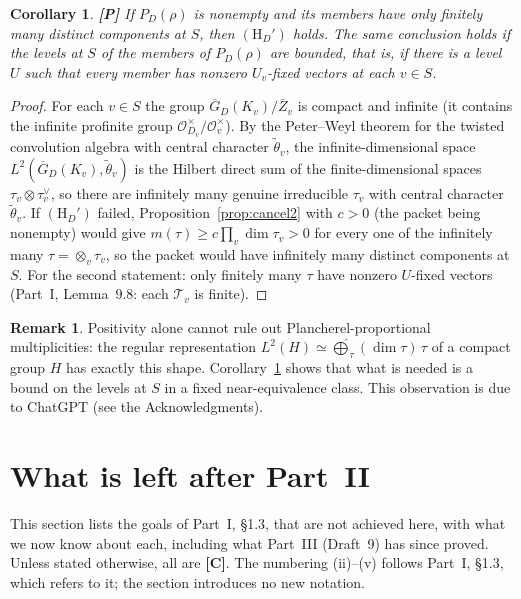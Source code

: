 \documentclass[12pt]{article}
\newcommand{\ov}[1]{\overline{#1}}
\newcommand{\cO}{\mathcal{O}}
\newcommand{\Zb}{\ov{Z}}
\newcommand{\GDb}{\ov{G}_D}
\newcommand{\Pv}{\textbf{[P]}}
\newcommand{\Cv}{\textbf{[C]}}
\theoremstyle{plain}
\newtheorem{corollary}[theorem]{Corollary}
\theoremstyle{definition}
\newtheorem{remark}[theorem]{Remark}
\begin{document}
\begin{corollary}\label{cor:finiteStypes}\Pv
If $P_D(\rho)$ is nonempty and its members have only finitely many distinct components at $S$, then $(\mathrm H_D')$ holds. The same conclusion holds if the levels at $S$ of the members of $P_D(\rho)$ are bounded, that is, if there is a level $U$ such that every member has nonzero $U_v$-fixed vectors at each $v\in S$.
\end{corollary}
\begin{proof}
For each $v\in S$ the group $\GDb(K_v)/\Zb_v$ is compact and infinite (it contains the infinite profinite group $\cO_{D_v}^\times/\cO_v^\times$). By the Peter--Weyl theorem for the twisted convolution algebra with central character $\tilde\theta_v$, the infinite-dimensional space $L^2(\GDb(K_v),\tilde\theta_v)$ is the Hilbert direct sum of the finite-dimensional spaces $\tau_v\otimes\tau_v^\vee$, so there are infinitely many genuine irreducible $\tau_v$ with central character $\tilde\theta_v$. If $(\mathrm H_D')$ failed, Proposition~\ref{prop:cancel2} with $c>0$ (the packet being nonempty) would give $m(\tau)\ge c\prod_v\dim\tau_v>0$ for every one of the infinitely many $\tau=\otimes_v\tau_v$, so the packet would have infinitely many distinct components at $S$. For the second statement: only finitely many $\tau$ have nonzero $U$-fixed vectors (Part~I, Lemma~9.8: each $\mathcal T_v$ is finite).
\end{proof}

\begin{remark}
Positivity alone cannot rule out Plancherel-proportional multiplicities: the regular representation $L^2(H)\simeq\widehat\bigoplus_\tau(\dim\tau)\,\tau$ of a compact group $H$ has exactly this shape. Corollary~\ref{cor:finiteStypes} shows that what is needed is a bound on the levels at $S$ in a fixed near-equivalence class. This observation is due to ChatGPT (see the Acknowledgments).
\end{remark}

\section{What is left after Part~II}\label{sec:partIII}
This section lists the goals of Part~I, \S1.3, that are not achieved here, with what we now know about each, including what Part~III (Draft~9) has since proved. Unless stated otherwise, all are \Cv. The numbering (ii)--(v) follows Part~I, \S1.3, which refers to it; the section introduces no new notation.
\end{document}

